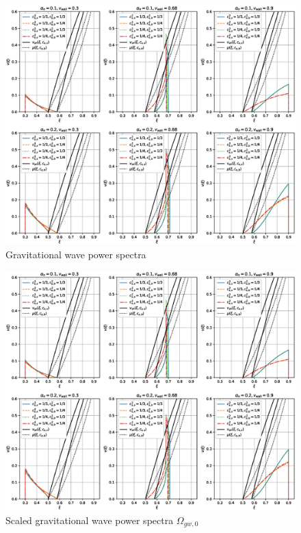 \begin{figure}[ht!]
\centering
\includegraphics[width=\textwidth]{msc2-python/fig/const_cs_gw_v.eps}
\caption{Gravitational wave power spectra}
\label{fig:gw_spectra}
\end{figure}

\begin{figure}[ht!]
\centering
\includegraphics[width=\textwidth]{msc2-python/fig/const_cs_gw_v.eps}
\caption{Scaled gravitational wave power spectra $\Omega_{gw,0}$}
\label{fig:omgw0}
\end{figure}

